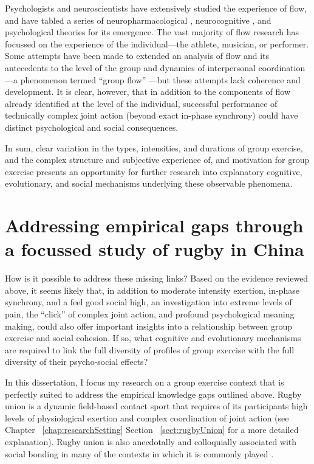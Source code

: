 \begin{CJK}{UTF8}{gbsn}
Psychologists and neuroscientists have extensively studied the experience of flow, and have tabled a series of neuropharmacological \citep{Boecker2008}, neurocognitive \citep{Dietrich2006,Dietrich2011,Labelle2013}, and psychological \citep{Csikszentmihalyi1992} theories for its emergence.  The vast majority of flow research has focussed on the experience of the individual---the athlete, musician, or performer.  Some attempts have been made to extended an analysis of flow and its antecedents to the level of the group and dynamics of interpersonal coordination---a phenomenon termed ``group flow'' \citep{Sawyer2006}---but these attempts lack coherence and development.
It is clear, however, that in addition to the components of flow already identified at the level of the individual, successful performance of technically complex joint action (beyond exact in-phase synchrony) could have distinct psychological and social consequences.

In sum, clear variation in the types, intensities, and durations of group exercise, and the complex structure and subjective experience of, and motivation for group exercise presents an opportunity for further research into explanatory cognitive, evolutionary, and social mechanisms underlying these observable phenomena.



\section{Addressing empirical gaps through a focussed study of rugby in China}
How is it possible to address these missing links?
Based on the evidence reviewed above, it seems likely that, in addition to moderate intensity exertion, in-phase synchrony, and a feel good social high, an investigation into extreme levels of pain, the ``click'' of complex joint action, and profound psychological meaning making, could also offer important insights into a relationship between group exercise and social cohesion.  If so, what cognitive and evolutionary mechanisms are required to link the full diversity of profiles of group exercise with the full diversity of their psycho-social effects?

In this dissertation, I focus my research on a group exercise context that is perfectly suited to address the empirical knowledge gaps outlined above.  Rugby union is a dynamic field-based contact sport that requires of its participants high levels of physiological exertion and complex coordination of joint action (see Chapter ~\ref{chap:researchSetting} Section ~\ref{sect:rugbyUnion} for a more detailed explanation).  Rugby union is also anecdotally and colloquially associated with social bonding in many of the contexts in which it is commonly played \citep{Dunning2005}.


\end{CJK}
